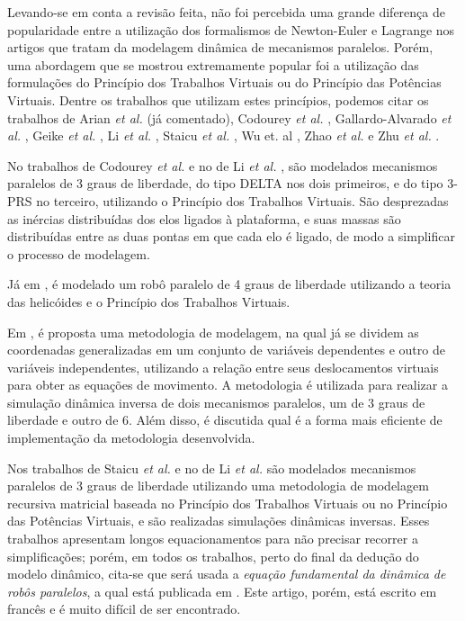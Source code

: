 \documentclass[]{politex}
\begin{document}
Levando-se em conta a revisão feita, não foi percebida uma grande diferença de popularidade entre a utilização dos formalismos de Newton-Euler e Lagrange nos artigos que tratam da modelagem dinâmica de mecanismos paralelos. Porém, uma abordagem que se mostrou extremamente popular foi a utilização das formulações do Princípio dos Trabalhos Virtuais ou do Princípio das Potências Virtuais. Dentre os trabalhos que utilizam estes princípios, podemos citar os trabalhos de Arian \emph{et al.} \cite{Arian} (já comentado), Codourey \emph{et al.} \cite{Codourey, CodoureyBurdet}, Gallardo-Alvarado \emph{et al.} \cite{GallardoAlvarado}, Geike \emph{et al.} \cite{Geike}, Li \emph{et al.} \cite{LiStaicu, Li}, Staicu \emph{et al.} \cite{Staicu, Staicu2, Staicu3, StaicuCarpCiocardia, StaicuLiu, StaicuZhang, StaicuZhangRugescu}, Wu et. al \cite{Wu}, Zhao \emph{et al.} \cite{Zhao, Zhao2} e  Zhu \emph{et al.} \cite{Zhu}.

No trabalhos de Codourey \emph{et al.} \cite{Codourey, CodoureyBurdet} e no de Li \emph{et al.} \cite{Li}, são modelados mecanismos paralelos de 3 graus de liberdade, do tipo DELTA nos dois primeiros, e do tipo 3-PRS no terceiro, utilizando o Princípio dos Trabalhos Virtuais. São desprezadas as inércias distribuídas dos elos ligados à plataforma, e suas massas são distribuídas entre as duas pontas em que cada elo é ligado, de modo a simplificar o processo de modelagem.

Já em \cite{GallardoAlvarado}, é modelado um robô paralelo de 4 graus de liberdade utilizando a teoria das helicóides e o Princípio dos Trabalhos Virtuais.

Em \cite{Geike}, é proposta uma metodologia de modelagem, na qual já se dividem as coordenadas generalizadas em um conjunto de variáveis dependentes e outro de variáveis independentes, utilizando a relação entre seus deslocamentos virtuais para obter as equações de movimento. A metodologia é utilizada para realizar a simulação dinâmica inversa de dois mecanismos paralelos, um de 3 graus de liberdade e outro de 6. Além disso, é discutida qual é a forma mais eficiente de implementação da metodologia desenvolvida.

Nos trabalhos de Staicu \emph{et al.} \cite{Staicu, Staicu2, Staicu3, StaicuCarpCiocardia, StaicuLiu, StaicuZhang, StaicuZhangRugescu} e no de Li \emph{et al.} \cite{LiStaicu} são modelados mecanismos paralelos de 3 graus de liberdade utilizando uma metodologia de modelagem recursiva matricial baseada no Princípio dos Trabalhos Virtuais ou no Princípio das Potências Virtuais, e são realizadas simulações dinâmicas inversas. Esses trabalhos apresentam longos equacionamentos para não precisar recorrer a simplificações; porém, em todos os trabalhos, perto do final da dedução do modelo dinâmico, cita-se que será usada a \emph{equação fundamental da dinâmica de robôs paralelos}, a qual está publicada em \cite{StaicuFrances}. Este artigo, porém, está escrito em francês e é muito difícil de ser encontrado.
\end{document}
